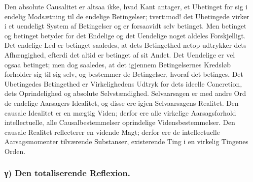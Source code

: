 \documentclass[11pt]{book}
\newcommand{\opage}[1]{\marginnote{\footnotesize\textit{[#1]}}}
\begin{document}
Den absolute Causalitet er altsaa ikke, hvad Kant antager, et Ubetinget
for sig i endelig Modsætning til de endelige Betingelser; tvertimod! det
Ubetingede virker i et uendeligt System af Betingelser og er forsaavidt
selv betinget. Men betinget og betinget betyder for det Endelige og det
Uendelige noget aldeles Forskjelligt. Det endelige Led er betinget
saaledes, at dets Betingethed netop udtrykker dets
\opage{123} \setcounter{footnote}{0}%
Afhængighed, efterdi det altid er betinget af sit Andet. Det Uendelige er
vel ogsaa betinget; men dog saaledes, at det igjennem Betingelsernes
Kredsløb forholder sig til sig selv, og bestemmer de Betingelser, hvoraf
det betinges. Det Ubetingedes Betingethed er Virkelighedens Udtryk for
dets ideelle Concretion, dets Oprindelighed og absolute Selvstændighed.
Selvaarsagen er med andre Ord de endelige Aarsagers Idealitet, og disse
ere igjen Selvaarsagens Realitet. Den causale Idealitet er en mægtig
Viden; derfor ere alle virkelige Aarsagsforhold intellectuelle, alle
Causalbestemmelser oprindelige Vidensbestemmelser. Den causale Realitet
reflecterer en vidende Magt; derfor ere de intellectuelle
Aarsagsmomenter tilværende Substanser, existerende Ting i en virkelig
Tingenes Orden.

\subsubsection*{γ) Den totaliserende Reflexion.}
\end{document}
